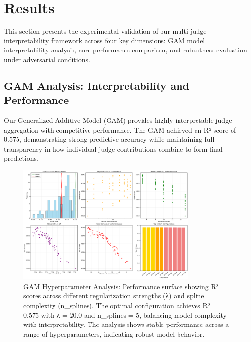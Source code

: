 \section{Results}

This section presents the experimental validation of our multi-judge interpretability framework across four key dimensions: GAM model interpretability analysis, core performance comparison, and robustness evaluation under adversarial conditions.

\subsection{GAM Analysis: Interpretability and Performance}

Our Generalized Additive Model (GAM) provides highly interpretable judge aggregation with competitive performance. The GAM achieved an R² score of 0.575, demonstrating strong predictive accuracy while maintaining full transparency in how individual judge contributions combine to form final predictions.

\begin{figure}[htbp]
    \centering
    \includegraphics[width=0.8\textwidth]{results/full_experiments/baseline_ultrafeedback_2000samples_20250816_213023/gam_analysis/gam_tuning_run_20250818_142018/gam_hyperparameter_analysis.png}
    \caption{GAM Hyperparameter Analysis: Performance surface showing R² scores across different regularization strengths (λ) and spline complexity (n\_splines). The optimal configuration achieves R² = 0.575 with λ = 20.0 and n\_splines = 5, balancing model complexity with interpretability. The analysis shows stable performance across a range of hyperparameters, indicating robust model behavior.}
    \label{fig:gam_hyperparameter_analysis}
\end{figure}

